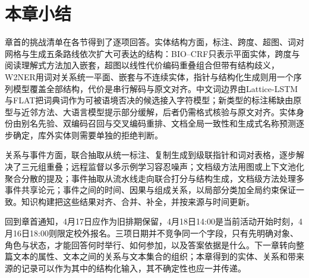 \begin{fullwidth}
  \noindent{}\par\medskip
  \noindent{}\par\medskip
  \noindent{}\par\medskip
  \noindent{}\par\medskip
  \noindent{}\par\medskip
  \noindent{}\par\medskip
  \noindent{}\par\medskip
  \noindent{}
\end{fullwidth}

\section{本章小结}
\label{sec:nlp-extraction-summary}

章首的挑战清单在各节得到了逐项回答。实体结构方面，标注、跨度、超图、词对网格与生成五条路线依次扩大可表达的结构：BIO--CRF只表示平面实体，跨度与阅读理解式方法加入嵌套，超图以线性代价编码重叠组合但带有结构歧义，W2NER用词对关系统一平面、嵌套与不连续实体，指针与结构化生成则用一个序列模型覆盖全部结构，代价是串行解码与原文对齐。中文词边界由Lattice-LSTM与FLAT把词典词作为可被语境否决的候选接入字符模型；新类型的标注稀缺由原型与近邻方法、大语言模型提示部分缓解，后者仍需格式核验与原文对齐。实体身份由别名先验、双编码召回与交叉编码重排、文档全局一致性和生成式名称预测逐步确定，库外实体则需要单独的拒绝判断。

关系与事件方面，联合抽取从统一标注、复制生成到级联指针和词对表格，逐步解决了三元组重叠；远程监督以多示例学习容忍噪声；文档级方法用图或上下文池化聚合分散的提及；事件抽取从流水线走向联合打分与结构生成，文档级方法处理多事件共享论元；事件之间的时间、因果与组成关系，以局部分类加全局约束保证一致。知识构建把这些结果对齐、合并、补全，并按来源与时间更新。

回到章首通知，4月17日应作为旧排期保留，4月18日14:00是当前活动开始时刻，4月16日18:00则限定校外报名。三项日期并不竞争同一个字段，只有先明确对象、角色与状态，才能回答何时举行、如何参加，以及答案依据是什么。下一章转向整篇文本的属性、文本之间的关系与文本集合的组织；本章得到的实体、关系和带来源的记录可以作为其中的结构化输入，其不确定性也应一并传递。
